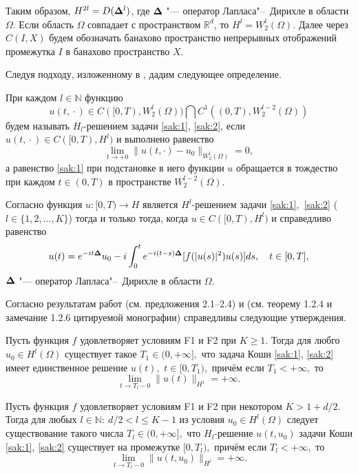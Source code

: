 Таким образом, $H^{2l}=D({\bf \Delta }^{l})$, где ${\bf \Delta }$ "---
оператор Лапласа"--~Дирихле в области $\Omega $. Если область $\Omega $ совпадает с  пространством $\mathbb R^d$, то $H^l=W_2^{l}(\Omega )$. Далее через
$C(I,X)$ будем обозначать банахово пространство непрерывных отображений промежутка $I$ в банахово пространство $X$.

Следуя подходу, изложенному в \cite{ Zhidkov, GV}, дадим следующее определение.

\begin{definition} 
При каждом $l\in \mathbb N $ функцию $$u(t,{}\cdot{})\in C([0,T),{W}^{l}_{2}(\Omega ))\bigcap
C^{1}((0,T),{W}^{l-2}_{2}(\Omega ))$$ будем называть
$H_{l}$-решением задачи \eqref{sak:1}{\rm ,} \eqref{sak:2}, если $u(t,{}\cdot{})\in
C([0,T),H^{l})$ и выполнено равенство $$\lim\limits_{t\to
+0}\|u(t,\cdot )-u_{0}\|_{W^{l}_{2}(\Omega )}=0,$$ а равенство \eqref{sak:1}
при подстановке в него функции $u$ обращается в тождество при
каждом $t\in (0,T)$ в пространстве $W^{l-2}_{2}(\Omega ).$
\end{definition}

\smallskip

Согласно \cite{Zhidkov} функция $u: [0, T)\to  H$ является $H^l$-решением задачи \eqref{sak:1},~\eqref{sak:2} ($l\in \{ 1, 2, \dots, K\}$) тогда и только тогда, когда  $u\in C([0, T),H^l)$ и справедливо равенство
\begin{equation}
u(t)=e^{-it{\bf \Delta }}u_{0}-i\int_{0}^{t}e^{-i(t-s){\bf\Delta }}[f(|u(s)|^2)u(s)]ds,\quad t\in [0,T],
\label{sak:5}
\end{equation}
${\bf \Delta }$ "--- оператор Лапласа"--~Дирихле в области $\Omega $.
  
Согласно результатам работ \cite{GV} (см. предложения 2.1--2.4) и \cite{Zhidkov} (см. теорему 1.2.4 и замечание
1.2.6 цитируемой монографии) справедливы  следующие утверждения.

\smallskip

\begin{theorem}[1]Пусть функция $f$ удовлетворяет условиям {\sc F1} и {\sc F2} при  ${K\geq 1.}$ 
Тогда  для любго $u_0\in H^l(\Omega )$ существует такое $T_1\in (0,+\infty ],$ что задача Коши \eqref{sak:1}{\rm ,} \eqref{sak:2} имеет единственное решение $u(t),$ $t\in [0,T_1),$  причём если $T_{1}<+\infty,$ то $$\lim\limits_{t\to T_{l}-0}\|u(t)\|_{H^{1}}=+\infty. $$
\end{theorem}

\smallskip
\begin{theorem}[2]Пусть функция $f$ удовлетворяет условиям {\sc F1} и {\sc F2} при некотором $K> 1+d/2.$ 
Тогда  для любых $l\in {\mathbb  N}:\ d/2<l\leq K-1$ из условия $u_0\in H^l(\Omega )$ следует существование такого числа $T_{l}\in (0,+\infty ],$ что $H_{l}$-решение $u(t,u_{0})$ задачи Коши \eqref{sak:1}{\rm ,} \eqref{sak:2} существует на промежутке $[0,T_{l}),$ причём если $T_{l}<+\infty,$ то $$\lim\limits_{t\to T_{l}-0}\|u(t,u_{0})\|_{H^{l}}=+\infty .$$
\end{theorem}

